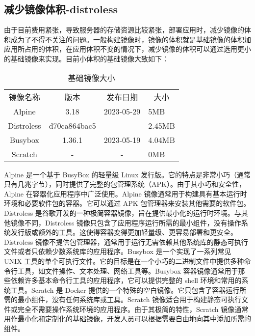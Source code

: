\documentclass[../../../dolphin-book-2023.tex]{subfiles}
\begin{document}
\subsection{减少镜像体积-distroless}

由于目前费用紧张，导致服务器的存储资源比较紧张，部署应用时，减少镜像的体积成为了不得不关注的问题。一般构建镜像时，镜像的体积就是基础镜像的体积加应用所占用的体积，在应用体积不变的情况下，减少镜像的体积可以通过选用更小的基础镜像来实现。目前小体积的基础镜像大致如下：

\begin{table}[htbp]
	\caption{基础镜像大小}
	\label{table:baseimagesize}
	\begin{center}
		\begin{tabular}{cccp{1cm}}
			\hline
			\multirow{1}{*}{镜像名称}
			& \multicolumn{1}{c}{版本}
            & \multicolumn{1}{c}{发布日期}
            & \multicolumn{1}{c}{大小}\\			
			\cline{1-4}
            Alpine & 3.18 & 2023-05-29 & 5MB \\ 
            \hline
            Distroless & d70ca864bac5 & & 2.45MB \\ 
			\hline
			Busybox & 1.36.1 & 2023-05-19 & 4.04MB \\
			\hline
            Scratch & - & - & 0MB \\
			\hline
		\end{tabular}	
	\end{center}
\end{table}

Alpine 是一个基于 BusyBox 的轻量级 Linux 发行版。它的特点是非常小巧（通常只有几兆字节），同时提供了完整的包管理系统（APK）。由于其小巧和安全性，Alpine 在容器化应用程序中广泛使用。Alpine 镜像通常用于构建具有基本运行时环境和必要软件包的容器。它可以通过 APK 包管理器来安装其他需要的软件包。Distroless 是谷歌开发的一种极简容器镜像，旨在提供最小化的运行时环境。与其他镜像不同，Distroless 镜像只包含了应用程序运行所需的最小组件，没有操作系统发行版或额外的工具。这使得容器变得更加轻量级、更容易部署和更安全。Distroless 镜像不提供包管理器，通常用于运行无需依赖其他系统库的静态可执行文件或者只依赖少数系统库的应用程序。Busybox 是一个实现了一系列常见 UNIX 工具的单个可执行文件。它的目标是在一个小巧的二进制文件中提供多种命令行工具，如文件操作、文本处理、网络工具等。Busybox 容器镜像通常用于那些依赖许多基本命令行工具的应用程序，它可以提供完整的 shell 环境和常用的系统工具。Scratch 是 Docker 提供的一个特殊的空白镜像。它只包含了容器运行所需的最小组件，没有任何系统库或工具。Scratch 镜像适合用于构建静态可执行文件或完全不需要操作系统环境的应用程序。由于其极简的特性，Scratch 镜像通常用作最小化和定制化的基础镜像，开发人员可以根据需要自由地向其中添加所需的组件。
\end{document}
